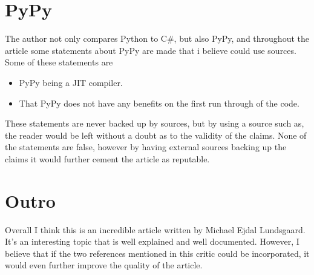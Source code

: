 \documentclass{article}
\begin{document}
\section*{PyPy}
 
The author not only compares Python to C\#, but also PyPy, and throughout the article some statements about PyPy are made that i believe could use sources. Some of these statements are
\begin{itemize}
 \item PyPy being a JIT compiler.
 \item That PyPy does not have any benefits on the first run through of the code.
\end{itemize}
These statements are never backed up by sources, but by using a source such as\cite{pypy}, the reader would be left without a doubt as to the validity of the claims. None of the statements are false, however by having external sources backing up the claims it would further cement the article as reputable.
 
\section*{Outro}
Overall I think this is an incredible article written by Michael Ejdal Lundsgaard. It's an interesting topic that is well explained and well documented. However, I believe that if the two references mentioned in this critic could be incorporated, it would even further improve the quality of the article.
 
 


 
\end{document}

